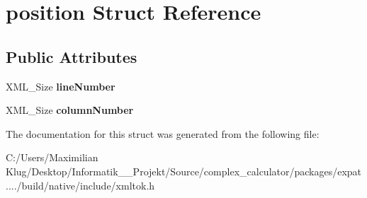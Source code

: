 \hypertarget{structposition}{}\section{position Struct Reference}
\label{structposition}
\subsection*{Public Attributes}
\begin{DoxyCompactItemize}
\item 
\mbox{\label{structposition_ab89991b9b0be0f57cf9b4f611d0dab88}} 
X\+M\+L\+\_\+\+Size {\bfseries line\+Number}
\item 
\mbox{\label{structposition_a3208bd87581c9abc5b20ee85790463b8}} 
X\+M\+L\+\_\+\+Size {\bfseries column\+Number}
\end{DoxyCompactItemize}


The documentation for this struct was generated from the following file\+:\begin{DoxyCompactItemize}
\item 
C\+:/\+Users/\+Maximilian Klug/\+Desktop/\+Informatik\+\_\+\_\+\+Projekt/\+Source/complex\+\_\+calculator/packages/expat..../build/native/include/xmltok.\+h\end{DoxyCompactItemize}
